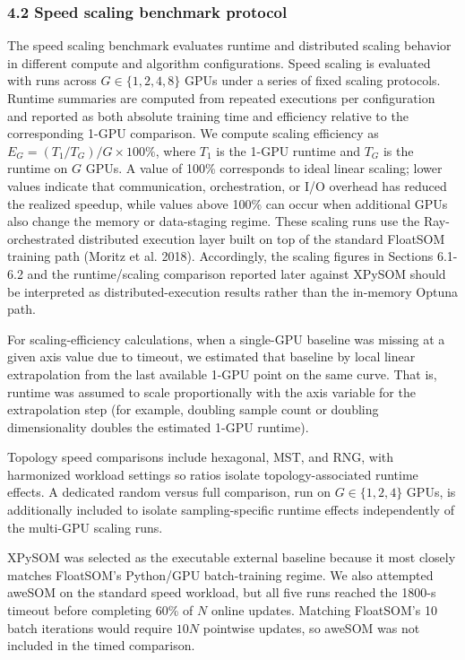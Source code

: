 \documentclass[
]{article}
\providecommand{\DIFadd}[1]{{\protect\color{blue} #1}} %
\providecommand{\DIFaddbegin}{} %
\providecommand{\DIFaddend}{} %
\begin{document}
\DIFaddend \subsubsection{4.2 Speed scaling benchmark
protocol}\label{speed-scaling-benchmark-protocol}

The speed scaling benchmark evaluates runtime and distributed scaling
behavior in different compute and algorithm configurations. Speed
scaling is evaluated with runs across \(G\in\{1,2,4,8\}\) GPUs under a
series of fixed scaling protocols. Runtime summaries are computed from
repeated executions per configuration and reported as both absolute
training time and efficiency relative to the corresponding 1-GPU
comparison. We compute scaling efficiency as
\(E_G=(T_1/T_G)/G \times 100\%\), where \(T_1\) is the 1-GPU runtime and
\(T_G\) is the runtime on \(G\) GPUs. A value of 100\% corresponds to
ideal linear scaling; lower values indicate that communication,
orchestration, or I/O overhead has reduced the realized speedup, while
values above 100\% can occur when additional GPUs also change the memory
or data-staging regime. These scaling runs use the Ray-orchestrated
distributed execution layer built on top of the standard FloatSOM
training path (Moritz et al. 2018). Accordingly, the scaling figures in
Sections 6.1-6.2 and the runtime/scaling comparison reported later
against XPySOM should be interpreted as distributed-execution results
rather than the in-memory Optuna path.

For scaling-efficiency calculations, when a single-GPU baseline was
missing at a given axis value due to timeout, we estimated that baseline
by local linear extrapolation from the last available 1-GPU point on the
same curve. That is, runtime was assumed to scale proportionally with
the axis variable for the extrapolation step (for example, doubling
sample count or doubling dimensionality doubles the estimated 1-GPU
runtime).

Topology speed comparisons include hexagonal, MST, and RNG, with
harmonized workload settings so ratios isolate topology-associated
runtime effects. A dedicated random versus full comparison, run on
\(G\in\{1,2,4\}\) GPUs, is additionally included to isolate
sampling-specific runtime effects independently of the multi-GPU scaling
runs.

\DIFaddbegin \DIFadd{XPySOM was selected as the executable external baseline because it most
closely matches FloatSOM's Python/GPU batch-training regime. We also
attempted aweSOM on the standard speed workload, but all five runs
reached the 1800-s timeout before completing 60\% of \(N\) online
updates. Matching FloatSOM's 10 batch iterations would require \(10N\)
pointwise updates, so aweSOM was not included in the timed comparison.
}
\end{document}
